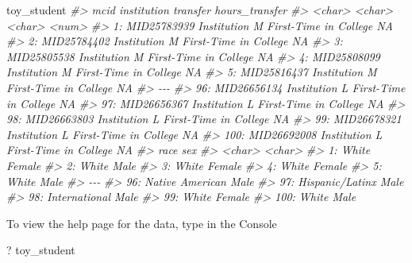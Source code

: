 \documentclass[
]{book}
\newenvironment{Shaded}{\begin{snugshade}}{\end{snugshade}}
\newcommand{\CommentTok}[1]{\textcolor[rgb]{0.56,0.35,0.01}{\textit{#1}}}
\newcommand{\NormalTok}[1]{#1}
\begin{document}
\begin{Shaded}
\begin{Highlighting}[]
\NormalTok{toy\_student}
\CommentTok{\#\textgreater{}             mcid   institution              transfer hours\_transfer}
\CommentTok{\#\textgreater{}           \textless{}char\textgreater{}        \textless{}char\textgreater{}                \textless{}char\textgreater{}          \textless{}num\textgreater{}}
\CommentTok{\#\textgreater{}   1: MID25783939 Institution M First{-}Time in College             NA}
\CommentTok{\#\textgreater{}   2: MID25784402 Institution M First{-}Time in College             NA}
\CommentTok{\#\textgreater{}   3: MID25805538 Institution M First{-}Time in College             NA}
\CommentTok{\#\textgreater{}   4: MID25808099 Institution M First{-}Time in College             NA}
\CommentTok{\#\textgreater{}   5: MID25816437 Institution M First{-}Time in College             NA}
\CommentTok{\#\textgreater{}  {-}{-}{-}                                                               }
\CommentTok{\#\textgreater{}  96: MID26656134 Institution L First{-}Time in College             NA}
\CommentTok{\#\textgreater{}  97: MID26656367 Institution L First{-}Time in College             NA}
\CommentTok{\#\textgreater{}  98: MID26663803 Institution L First{-}Time in College             NA}
\CommentTok{\#\textgreater{}  99: MID26678321 Institution L First{-}Time in College             NA}
\CommentTok{\#\textgreater{} 100: MID26692008 Institution L First{-}Time in College             NA}
\CommentTok{\#\textgreater{}                 race    sex}
\CommentTok{\#\textgreater{}               \textless{}char\textgreater{} \textless{}char\textgreater{}}
\CommentTok{\#\textgreater{}   1:           White Female}
\CommentTok{\#\textgreater{}   2:           White   Male}
\CommentTok{\#\textgreater{}   3:           White Female}
\CommentTok{\#\textgreater{}   4:           White Female}
\CommentTok{\#\textgreater{}   5:           White   Male}
\CommentTok{\#\textgreater{}  {-}{-}{-}                       }
\CommentTok{\#\textgreater{}  96: Native American   Male}
\CommentTok{\#\textgreater{}  97: Hispanic/Latinx   Male}
\CommentTok{\#\textgreater{}  98:   International   Male}
\CommentTok{\#\textgreater{}  99:           White Female}
\CommentTok{\#\textgreater{} 100:           White   Male}
\end{Highlighting}
\end{Shaded}

To view the help page for the data, type in the Console

\begin{Shaded}
\begin{Highlighting}[]
\NormalTok{? toy\_student}
\end{Highlighting}
\end{Shaded}
\end{document}
